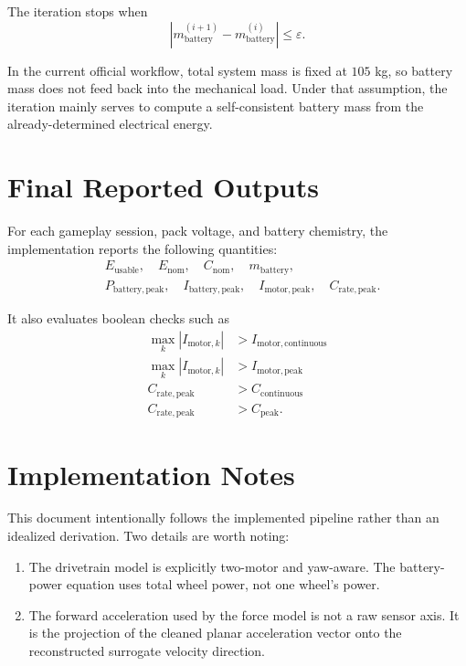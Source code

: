 \documentclass[11pt]{article}
\begin{document}
The iteration stops when
\begin{equation}
\left|m_{\mathrm{battery}}^{(i+1)} - m_{\mathrm{battery}}^{(i)}\right| \le \varepsilon.
\end{equation}

In the current official workflow, total system mass is fixed at \(105\) kg, so battery mass does not feed back into the mechanical load. Under that assumption, the iteration mainly serves to compute a self-consistent battery mass from the already-determined electrical energy.

\section{Final Reported Outputs}
For each gameplay session, pack voltage, and battery chemistry, the implementation reports the following quantities:
\begin{align}
&E_{\mathrm{usable}},\quad
E_{\mathrm{nom}},\quad
C_{\mathrm{nom}},\quad
m_{\mathrm{battery}}, \\
&P_{\mathrm{battery,peak}},\quad
I_{\mathrm{battery,peak}},\quad
I_{\mathrm{motor,peak}},\quad
C_{\mathrm{rate,peak}}.
\end{align}

It also evaluates boolean checks such as
\begin{align}
\max_k |I_{\mathrm{motor},k}| &> I_{\mathrm{motor,continuous}} \\
\max_k |I_{\mathrm{motor},k}| &> I_{\mathrm{motor,peak}} \\
C_{\mathrm{rate,peak}} &> C_{\mathrm{continuous}} \\
C_{\mathrm{rate,peak}} &> C_{\mathrm{peak}}.
\end{align}

\section*{Implementation Notes}
This document intentionally follows the implemented pipeline rather than an idealized derivation. Two details are worth noting:
\begin{enumerate}
\item The drivetrain model is explicitly two-motor and yaw-aware. The battery-power equation uses total wheel power, not one wheel's power.
\item The forward acceleration used by the force model is not a raw sensor axis. It is the projection of the cleaned planar acceleration vector onto the reconstructed surrogate velocity direction.
\end{enumerate}
\end{document}
